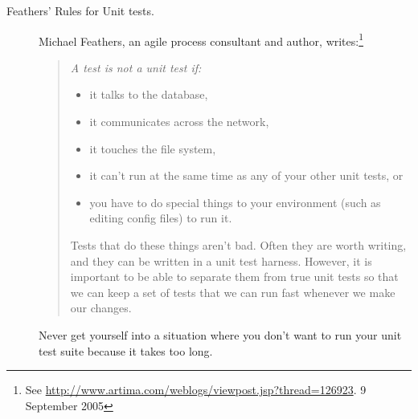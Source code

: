 \documentclass[a4paper,10pt,twoside]{book}
\begin{document}
\begin{description}


\item[Feathers' Rules for Unit tests.]
  Michael Feathers, an  agile process consultant and author, writes:\footnote{See \url{http://www.artima.com/weblogs/viewpost.jsp?thread=126923}. 9 September 2005} 
  \begin{quotation}
  \noindent
  {\it
  A test is not a unit test if:
  \begin{itemize}
	\item it talks to the database,
	\item it communicates across the network,
	\item it touches the file system,
	\item it can't run at the same time as any of your other unit tests, or
	\item you have to do special things to your environment (such as editing config files) to run it.
 \end{itemize}
Tests that do these things aren't bad. Often they are worth writing, and they can be written in a unit test harness. However, it is important to be able to separate them from true unit tests so that we can keep a set of tests that we can run fast whenever we make our changes.
 }
  \end{quotation}
Never get yourself into a situation where you don't want to run your unit test suite because it takes too long.   
 

\end{description}
\end{document}
